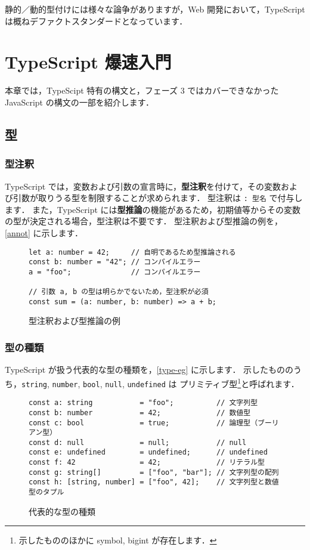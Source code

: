 \documentclass[a4j, 11pt]{jarticle}
\begin{document}
静的／動的型付けには様々な論争がありますが，Web 開発において，TypeScript は概ねデファクトスタンダードとなっています．

\section{TypeScript 爆速入門}

本章では，TypeScipt 特有の構文と，フェーズ 3 ではカバーできなかった JavaScript の構文の一部を紹介します．

\subsection{型}

\subsubsection{型注釈}

TypeScript では，変数および引数の宣言時に，\textbf{型注釈}を付けて，その変数および引数が取りうる型を制限することが求められます．
型注釈は \verb|: 型名| で付与します．
また，TypeScript には\textbf{型推論}の機能があるため，初期値等からその変数の型が決定される場合，型注釈は不要です．
型注釈および型推論の例を，\autoref{annot} に示します．

\begin{figure}[H]
\caption{型注釈および型推論の例}
\label{annot}
\begin{lstlisting}
let a: number = 42;     // 自明であるため型推論される
const b: number = "42"; // コンパイルエラー
a = "foo";              // コンパイルエラー

// 引数 a, b の型は明らかでないため，型注釈が必須
const sum = (a: number, b: number) => a + b;
\end{lstlisting}
\end{figure}

\subsubsection{型の種類}

TypeScript が扱う代表的な型の種類を，\autoref{type-eg} に示します．
示したもののうち，\verb|string|, \verb|number|, \verb|bool|, \verb|null|, \verb|undefined| は
プリミティブ型\footnote{示したもののほかに symbol, bigint が存在します．}と呼ばれます．

\begin{figure}[H]
\caption{代表的な型の種類}
\label{type-eg}
\begin{lstlisting}
const a: string           = "foo";          // 文字列型
const b: number           = 42;             // 数値型
const c: bool             = true;           // 論理型（ブーリアン型）
const d: null             = null;           // null
const e: undefined        = undefined;      // undefined
const f: 42               = 42;             // リテラル型
const g: string[]         = ["foo", "bar"]; // 文字列型の配列
const h: [string, number] = ["foo", 42];    // 文字列型と数値型のタプル
\end{lstlisting}
\end{figure}
\end{document}
